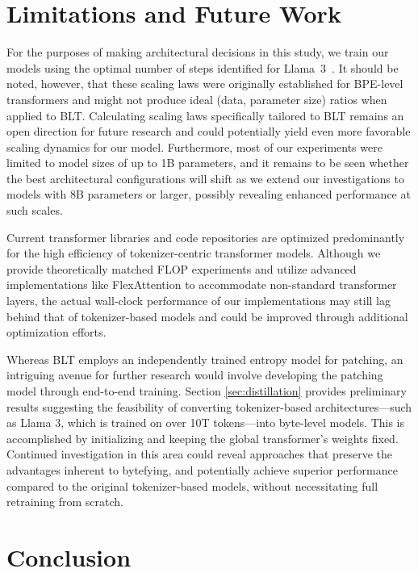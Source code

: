 \section{Limitations and Future Work}

For the purposes of making architectural decisions in this study, we train our models using the optimal number of steps identified for Llama~3~\citep{dubey2024llama}. It should be noted, however, that these scaling laws were originally established for BPE-level transformers and might not produce ideal (data, parameter size) ratios when applied to {\textsc BLT}. Calculating scaling laws specifically tailored to {\textsc BLT} remains an open direction for future research and could potentially yield even more favorable scaling dynamics for our model. Furthermore, most of our experiments were limited to model sizes of up to 1B parameters, and it remains to be seen whether the best architectural configurations will shift as we extend our investigations to models with 8B parameters or larger, possibly revealing enhanced performance at such scales.

Current transformer libraries and code repositories are optimized predominantly for the high efficiency of tokenizer-centric transformer models. Although we provide theoretically matched FLOP experiments and utilize advanced implementations like FlexAttention to accommodate non-standard transformer layers, the actual wall-clock performance of our implementations may still lag behind that of tokenizer-based models and could be improved through additional optimization efforts.

Whereas {\textsc BLT} employs an independently trained entropy model for patching, an intriguing avenue for further research would involve developing the patching model through end-to-end training. Section \ref{sec:distillation} provides preliminary results suggesting the feasibility of converting tokenizer-based architectures—such as Llama 3, which is trained on over 10T tokens—into byte-level models. This is accomplished by initializing and keeping the global transformer's weights fixed. Continued investigation in this area could reveal approaches that preserve the advantages inherent to bytefying, and potentially achieve superior performance compared to the original tokenizer-based models, without necessitating full retraining from scratch.

\section{Conclusion}
\label{section:conclusion}

